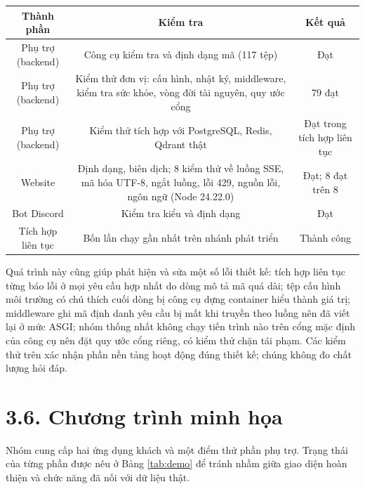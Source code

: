 \begin{longtable*}{|C{0.27}|C{0.43}|C{0.30}|}
\hline \textbf{Thành phần} & \textbf{Kiểm tra} & \textbf{Kết quả} \\ \hline
Phụ trợ (backend) & Công cụ kiểm tra và định dạng mã (117 tệp) & Đạt \\ \hline
Phụ trợ (backend) & Kiểm thử đơn vị: cấu hình, nhật ký, middleware, kiểm tra sức khỏe, vòng đời tài nguyên, quy ước cổng & 79 đạt \\ \hline
Phụ trợ (backend) & Kiểm thử tích hợp với PostgreSQL, Redis, Qdrant thật & Đạt trong tích hợp liên tục \\ \hline
Website & Định dạng, biên dịch; 8 kiểm thử về luồng SSE, mã hóa UTF-8, ngắt luồng, lỗi 429, nguồn lỗi, ngôn ngữ (Node 24.22.0) & Đạt; 8 đạt trên 8 \\ \hline
Bot Discord & Kiểm tra kiểu và định dạng & Đạt \\ \hline
Tích hợp liên tục & Bốn lần chạy gần nhất trên nhánh phát triển & Thành công \\ \hline
\end{longtable*}
\tabend


Quá trình này cũng giúp phát hiện và sửa một số lỗi thiết kế: tích hợp liên tục từng báo lỗi ở mọi yêu cầu hợp nhất do dòng mô tả mã quá dài; tệp cấu hình môi trường có chú thích cuối dòng bị công cụ dựng container hiểu thành giá trị; middleware ghi mã định danh yêu cầu bị mất khi truyền theo luồng nên đã viết lại ở mức ASGI; nhóm thống nhất không chạy tiến trình nào trên cổng mặc định của công cụ nên đặt quy ước cổng riêng, có kiểm thử chặn tái phạm. Các kiểm thử trên xác nhận phần nền tảng hoạt động đúng thiết kế; chúng không đo chất lượng hỏi đáp.


\section{3.6. Chương trình minh họa}

Nhóm cung cấp hai ứng dụng khách và một điểm thử phần phụ trợ. Trạng thái của từng phần được nêu ở Bảng \ref{tab:demo} để tránh nhầm giữa giao diện hoàn thiện và chức năng đã nối với dữ liệu thật.


